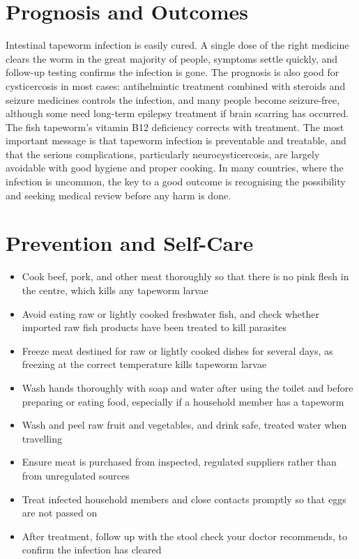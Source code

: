 \section*{Prognosis and Outcomes}
Intestinal tapeworm infection is easily cured. A single dose of the right medicine clears the worm in the great majority of people, symptoms settle quickly, and follow-up testing confirms the infection is gone. The prognosis is also good for cysticercosis in most cases: antihelmintic treatment combined with steroids and seizure medicines controls the infection, and many people become seizure-free, although some need long-term epilepsy treatment if brain scarring has occurred. The fish tapeworm's vitamin B12 deficiency corrects with treatment. The most important message is that tapeworm infection is preventable and treatable, and that the serious complications, particularly neurocysticercosis, are largely avoidable with good hygiene and proper cooking. In many countries, where the infection is uncommon, the key to a good outcome is recognising the possibility and seeking medical review before any harm is done.

\section*{Prevention and Self-Care}
\begin{itemize}
    \item Cook beef, pork, and other meat thoroughly so that there is no pink flesh in the centre, which kills any tapeworm larvae
    \item Avoid eating raw or lightly cooked freshwater fish, and check whether imported raw fish products have been treated to kill parasites
    \item Freeze meat destined for raw or lightly cooked dishes for several days, as freezing at the correct temperature kills tapeworm larvae
    \item Wash hands thoroughly with soap and water after using the toilet and before preparing or eating food, especially if a household member has a tapeworm
    \item Wash and peel raw fruit and vegetables, and drink safe, treated water when travelling
    \item Ensure meat is purchased from inspected, regulated suppliers rather than from unregulated sources
    \item Treat infected household members and close contacts promptly so that eggs are not passed on
    \item After treatment, follow up with the stool check your doctor recommends, to confirm the infection has cleared
\end{itemize}

